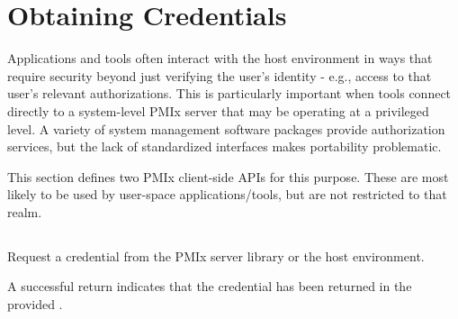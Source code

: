 \section{Obtaining Credentials}
\label{chap:api_security:obtain}

Applications and tools often interact with the host environment in ways that require security beyond just verifying the user's identity - e.g., access to that user's relevant authorizations. This is particularly important when tools connect directly to a system-level \ac{PMIx} server that may be operating at a privileged level. A variety of system management software packages provide authorization services, but the lack of standardized interfaces makes portability problematic.

This section defines two \ac{PMIx} client-side \acp{API} for this purpose. These are most likely to be used by user-space applications/tools, but are not restricted to that realm.

\subsection{}

\summary

Request a credential from the \ac{PMIx} server library or the host environment.

\format


\begin{arglist}
\end{arglist}

A successful return indicates that the credential has been returned in the provided .

\returnsimple

